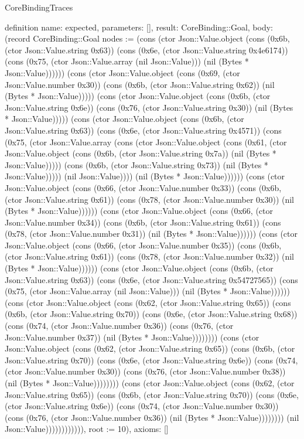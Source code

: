 \begin{lexlean}{CoreBindingTraces}
\begin{semanticmodule}
definition{
 name: expected,
 parameters: [],
 result: CoreBinding::Goal,
 body: (record CoreBinding::Goal {nodes := (cons (ctor Json::Value.object (cons (0x6b, (ctor Json::Value.string 0x63)) (cons (0x6e, (ctor Json::Value.string 0x4e6174)) (cons (0x75, (ctor Json::Value.array (nil Json::Value))) (nil (Bytes * Json::Value)))))) (cons (ctor Json::Value.object (cons (0x69, (ctor Json::Value.number 0x30)) (cons (0x6b, (ctor Json::Value.string 0x62)) (nil (Bytes * Json::Value))))) (cons (ctor Json::Value.object (cons (0x6b, (ctor Json::Value.string 0x6e)) (cons (0x76, (ctor Json::Value.string 0x30)) (nil (Bytes * Json::Value))))) (cons (ctor Json::Value.object (cons (0x6b, (ctor Json::Value.string 0x63)) (cons (0x6e, (ctor Json::Value.string 0x4571)) (cons (0x75, (ctor Json::Value.array (cons (ctor Json::Value.object (cons (0x61, (ctor Json::Value.object (cons (0x6b, (ctor Json::Value.string 0x7a)) (nil (Bytes * Json::Value))))) (cons (0x6b, (ctor Json::Value.string 0x73)) (nil (Bytes * Json::Value))))) (nil Json::Value)))) (nil (Bytes * Json::Value)))))) (cons (ctor Json::Value.object (cons (0x66, (ctor Json::Value.number 0x33)) (cons (0x6b, (ctor Json::Value.string 0x61)) (cons (0x78, (ctor Json::Value.number 0x30)) (nil (Bytes * Json::Value)))))) (cons (ctor Json::Value.object (cons (0x66, (ctor Json::Value.number 0x34)) (cons (0x6b, (ctor Json::Value.string 0x61)) (cons (0x78, (ctor Json::Value.number 0x31)) (nil (Bytes * Json::Value)))))) (cons (ctor Json::Value.object (cons (0x66, (ctor Json::Value.number 0x35)) (cons (0x6b, (ctor Json::Value.string 0x61)) (cons (0x78, (ctor Json::Value.number 0x32)) (nil (Bytes * Json::Value)))))) (cons (ctor Json::Value.object (cons (0x6b, (ctor Json::Value.string 0x63)) (cons (0x6e, (ctor Json::Value.string 0x54727565)) (cons (0x75, (ctor Json::Value.array (nil Json::Value))) (nil (Bytes * Json::Value)))))) (cons (ctor Json::Value.object (cons (0x62, (ctor Json::Value.string 0x65)) (cons (0x6b, (ctor Json::Value.string 0x70)) (cons (0x6e, (ctor Json::Value.string 0x68)) (cons (0x74, (ctor Json::Value.number 0x36)) (cons (0x76, (ctor Json::Value.number 0x37)) (nil (Bytes * Json::Value)))))))) (cons (ctor Json::Value.object (cons (0x62, (ctor Json::Value.string 0x65)) (cons (0x6b, (ctor Json::Value.string 0x70)) (cons (0x6e, (ctor Json::Value.string 0x6e)) (cons (0x74, (ctor Json::Value.number 0x30)) (cons (0x76, (ctor Json::Value.number 0x38)) (nil (Bytes * Json::Value)))))))) (cons (ctor Json::Value.object (cons (0x62, (ctor Json::Value.string 0x65)) (cons (0x6b, (ctor Json::Value.string 0x70)) (cons (0x6e, (ctor Json::Value.string 0x6e)) (cons (0x74, (ctor Json::Value.number 0x30)) (cons (0x76, (ctor Json::Value.number 0x36)) (nil (Bytes * Json::Value)))))))) (nil Json::Value)))))))))))), root := 10}),
 axioms: []
}


\end{semanticmodule}
\end{lexlean}
